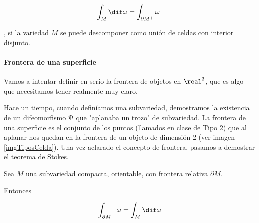 \begin{theorem}\label{thmStokesCeldas}
\[ \int_M \dif \omega = \int_{\partial  M^+}\omega \]

, si la variedad $M$ se puede descomponer como unión de celdas con interior disjunto. 
\end{theorem} 

\paragraph{Frontera de una superficie}
Vamos a intentar definir en serio la frontera de objetos en $\real^3$, que es algo que necesitamos tener realmente muy claro.


Hace un tiempo, cuando definíamos una subvariedad, demostramos la existencia de un difeomorfismo Ψ que "aplanaba un trozo" de subvariedad. La frontera de una superficie es el conjunto de los puntos (llamados en clase de Tipo 2) que al aplanar nos quedan en la frontera de un objeto de dimensión 2 (ver imagen \ref{imgTiposCelda}).
Una vez aclarado el concepto de frontera, pasamos a demostrar el teorema de Stokes.


\begin{theorem}
Sea $M$ una subvariedad compacta, orientable, con frontera relativa $\partial  M$.

Entonces

\[\int_{\partial  M^+}\omega = \int_M \dif \omega \]

\end{theorem}

